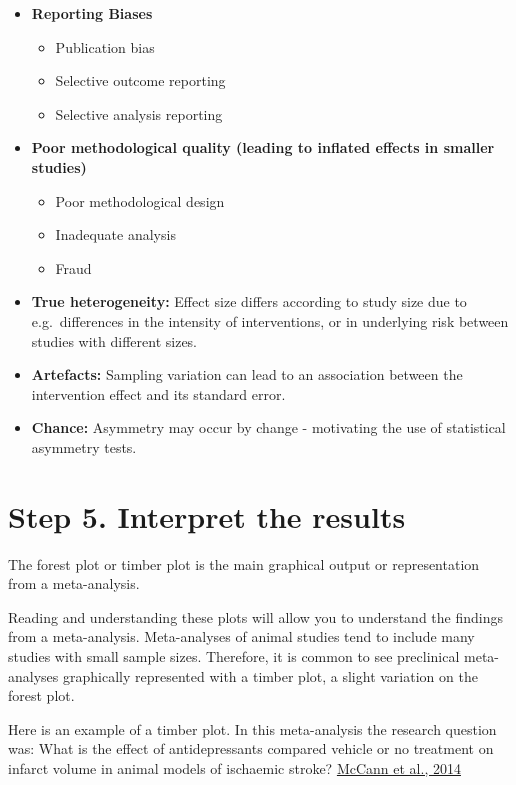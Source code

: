 \documentclass[
]{book}
\providecommand{\tightlist}{%
  \setlength{\itemsep}{0pt}\setlength{\parskip}{0pt}}
\begin{document}
\begin{itemize}
\item
  \textbf{Reporting Biases}

  \begin{itemize}
  \tightlist
  \item
    Publication bias
  \item
    Selective outcome reporting
  \item
    Selective analysis reporting
  \end{itemize}
\item
  \textbf{Poor methodological quality (leading to inflated effects in smaller studies)}

  \begin{itemize}
  \tightlist
  \item
    Poor methodological design
  \item
    Inadequate analysis
  \item
    Fraud
  \end{itemize}
\item
  \textbf{True heterogeneity:} Effect size differs according to study size due to e.g.~differences in the intensity of interventions, or in underlying risk between studies with different sizes.
\item
  \textbf{Artefacts:} Sampling variation can lead to an association between the intervention effect and its standard error.
\item
  \textbf{Chance:} Asymmetry may occur by change - motivating the use of statistical asymmetry tests.
\end{itemize}

\hypertarget{step-5.-interpret-the-results}{%
\section{Step 5. Interpret the results}\label{step-5.-interpret-the-results}}

The forest plot or timber plot is the main graphical output or representation from a meta-analysis.

Reading and understanding these plots will allow you to understand the findings from a meta-analysis. Meta-analyses of animal studies tend to include many studies with small sample sizes. Therefore, it is common to see preclinical meta-analyses graphically represented with a timber plot, a slight variation on the forest plot.

Here is an example of a timber plot. In this meta-analysis the research question was: What is the effect of antidepressants compared vehicle or no treatment on infarct volume in animal models of ischaemic stroke? \href{https://doi.org/10.1161/STROKEAHA.114.006304}{McCann et al., 2014}
\end{document}
